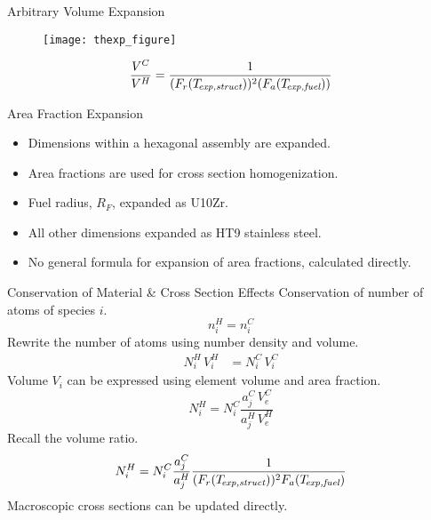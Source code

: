 \begin{frame}{Arbitrary Volume Expansion}
  \begin{figure}
    \centering
    \texttt{[image: thexp\_figure]}
    \label{fig:thexp_figure}
  \end{figure}
  \vspace{-0.5in}
  \begin{equation}
    \frac{V^C}{V^H} = \frac{1}{(F_r(T_{\!\mbox{\scriptsize \em exp,struct}}))^2 (F_a({T_{\!\mbox{\scriptsize \em exp,fuel}}}))}
  \end{equation}
\end{frame}

\begin{frame}{Area Fraction Expansion}
  \begin{itemize}
    \item Dimensions within a hexagonal assembly are expanded.
    \item Area fractions are used for cross section homogenization.
    \item Fuel radius, $R_F$, expanded as U10Zr.
    \item All other dimensions expanded as HT9 stainless steel.
    \item No general formula for expansion of area fractions, calculated
      directly.
  \end{itemize}
\end{frame}

\begin{frame}{Conservation of Material \& Cross Section Effects}
  Conservation of number of atoms of species $i$.
  \begin{equation}
    n_i^H = n_i^C
  \end{equation}
  Rewrite the number of atoms using number density and volume.
  \begin{align}
    N_i^H \, V_i^H &= N_i^C \, V_i^C
  \end{align}
  Volume $V_i$ can be expressed using element volume and area fraction.
  \begin{equation}
    N_i^H = N_i^C \frac{a_j^C \, V_e^C}{a_j^H \, V_e^H}
  \end{equation}
  Recall the volume ratio.
  \begin{equation}
    N_i^H = N_i^C \frac{a_j^C}{a_j^H} 
      \frac{1}{(F_r(T_{\!\mbox{\scriptsize \em exp,struct}}))^2 F_a({T_{\!\mbox{\scriptsize \em exp,fuel}}})}
  \end{equation}
  Macroscopic cross sections can be updated directly.
\end{frame}


